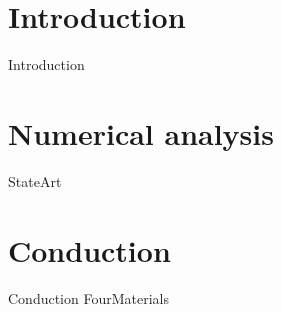 
\setlength{\parindent}{0pt}

\usepackage{epigraph}
\usepackage{tocloft}
\usepackage{mathcomp}
\usepackage{subcaption}

\usepackage{multicol}
\usepackage[T1]{fontenc}
\usepackage{titlesec, blindtext, color}
\newcommand{\hsp}{\hspace{20pt}}
\titleformat{\chapter}[hang]{\Huge\bfseries}{\thechapter\hsp\textcolor{gray75}{|}\hsp}{0pt}{\Huge\bfseries}


\renewcommand{\familydefault}{\sfdefault}



\newpage\thispagestyle{EmptyPage}


\setcounter{tocdepth}{3}
\tableofcontents
\pagebreak

\renewcommand{\cfttabnumwidth}{4em}
\listoftables
\pagebreak

\renewcommand{\cftfignumwidth}{4em}
\listoffigures



\newpage
{}

\newpage
\setlength{\parskip}{1em}

\part{Introduction}
{Introduction}

\part{Numerical analysis}
{StateArt}

\part{Conduction}
{Conduction}
{FourMaterials}

